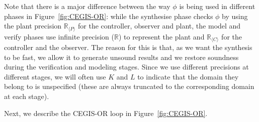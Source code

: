 \documentclass[sigconf]{llncs}
\newcommand{\mat}[1]{{#1}}
\begin{document}
Note that there is a major difference between
the way $\phi$ is being used in different phases in Figure~\ref{fig:CEGIS-OR}: while the
{\sc synthesise} phase checks $\phi$ by using the plant precision
$\mathbb{R}_{\langle P \rangle}$ for the controller, observer and
plant, the {\sc model} and {\sc verify} phases use infinite precision ($\mathbb{R}$) to represent
the plant and $\mathbb{R}_{\langle C \rangle}$ for the controller and
the observer. The reason for this is that, as we want the
synthesis to be fast, we allow it to generate unsound results
and we restore soundness during the verification and modeling stages. 
Since we use different precisions at different stages, we will often use $\mat{K}$ and $\mat{L}$ to indicate that the domain they belong to is unspecified
(these are always truncated to the corresponding domain at each stage).

\medskip

Next, we describe the CEGIS-OR loop in Figure~\ref{fig:CEGIS-OR}.
\end{document}
